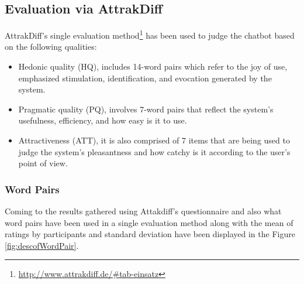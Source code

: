\subsection{Evaluation via AttrakDiff}
AttrakDiff's single evaluation method\footnote{\url{http://www.attrakdiff.de/#tab-einsatz}} has been used to judge the chatbot based on the following qualities:
\begin{itemize}
    \item Hedonic quality (HQ), includes 14-word pairs which refer to the joy of use, emphasized stimulation, identification, and evocation generated by the system.
    \item Pragmatic quality (PQ), involves 7-word pairs that reflect the system's usefulness, efficiency, and how easy is it to use.
    \item Attractiveness (ATT), it is also comprised of 7 items that are being used to judge the system's pleasantness and how catchy is it according to the user's point of view.
\end{itemize} 

\subsubsection*{Word Pairs}
Coming to the results gathered using Attakdiff's questionnaire and also what word pairs have been used in a single evaluation method along with the mean of ratings by participants and standard deviation have been displayed in the Figure \ref{fig:descofWordPair}.

